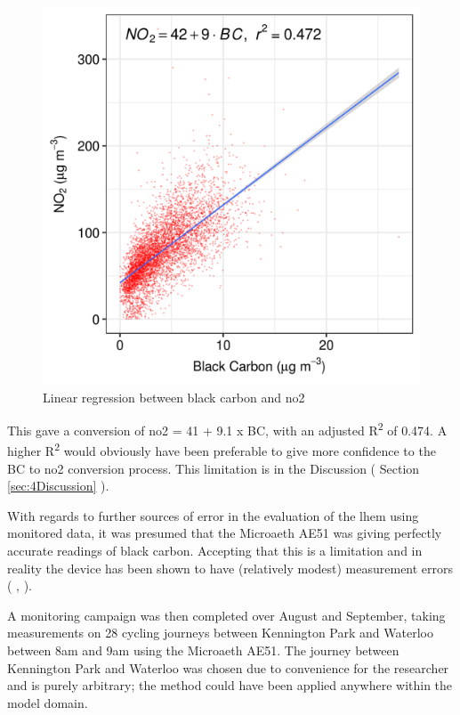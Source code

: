 \begin{figure}[H]
\centering
\includegraphics[scale=1]{images/black_carbon_no2_conversion.png}
\caption{Linear regression between black carbon and \gls{no2}}
\label{fig:black_carbon_no2_conversion}
\end{figure}

This gave a conversion of \gls{no2} = 41 + 9.1 x BC, with an adjusted R\textsuperscript{2} of 0.474. A higher R\textsuperscript{2} would obviously have been preferable to give more confidence to the BC to \gls{no2} conversion process. This limitation is in the Discussion ( Section \ref{sec:4Discussion} ).

With regards to further sources of error in the evaluation of the \gls{lhem} using monitored data, it was presumed that the Microaeth AE51 was giving perfectly accurate readings of black carbon. Accepting that this is a limitation and in reality the device has been shown to have (relatively modest) measurement errors ( \cite{Cheng2013}, \cite{Viana2015} ).

A monitoring campaign was then completed over August and September, taking measurements on 28 cycling journeys between Kennington Park and Waterloo  between 8am and 9am using the Microaeth AE51. The journey between Kennington Park and Waterloo was chosen due to convenience for the researcher and is purely arbitrary; the method could have been applied anywhere within the model domain.

